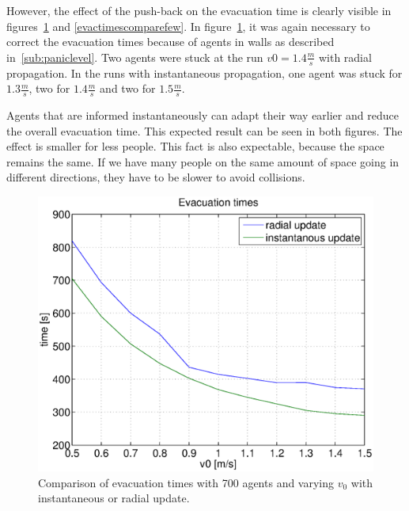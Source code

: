 \documentclass[11pt]{article}
\begin{document}
However, the effect of the push-back on the evacuation time is clearly visible
in figures~\ref{evactimescomparemany} and \ref{evactimescomparefew}.  In
figure~\ref{evactimescomparemany}, it was again necessary to correct the
evacuation times because of agents in walls as described
in~\ref{sub:paniclevel}.  Two agents were stuck at the run \(v0 =
1.4\frac{m}{s}\) with radial propagation.  In the runs with instantaneous
propagation, one agent was stuck for \(1.3\frac{m}{s}\), two for
\(1.4\frac{m}{s}\) and two for \(1.5\frac{m}{s}\).

Agents that are informed instantaneously can adapt their way earlier and
reduce the overall evacuation time. This expected result can be seen in both
figures.  The effect is smaller for less people. This fact is also expectable,
because the space remains the same. If we have many people on the same amount
of space going in different directions, they have to be slower to avoid
collisions.

\begin{figure}[h]
	\centering
	\includegraphics[scale=0.5]{images/evactimescomparemany.eps}
	\caption{Comparison of evacuation times with 700 agents and varying \(v_0\) with instantaneous or radial update. 	}
	\label{evactimescomparemany}
\end{figure}
\end{document}
